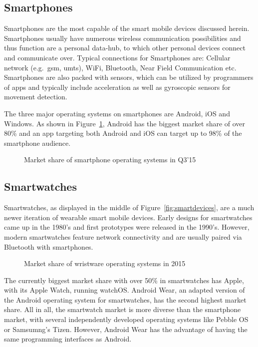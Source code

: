 \subsection{Smartphones}
Smartphones are the most capable of the smart mobile devices discussed herein. Smartphones usually have numerous wireless communication possibilities and thus function are a personal data-hub, to which other personal devices connect and communicate over. Typical connections for Smartphones are: Cellular network (e.g.\ \acrshort{gsm}, \acrshort{umts}), WiFi, Bluetooth, Near Field Communication etc. Smartphones are also packed with sensors, which can be utilized by programmers of \Glspl{app} and typically include acceleration as well as gyroscopic sensors for movement detection.

The three major operating systems on smartphones are Android, iOS and Windows. As shown in Figure~\ref{fig:smartphoneosmarketshare}, Android has the biggest market share of over 80\% and an \gls{app} targeting both Android and iOS can target up to 98\% of the smartphone audience.

\begin{figure}
    \centering
    
    \caption{Market share of smartphone operating systems in Q3'15\cite{gartner2015smartosmarketshare}}
    \label{fig:smartphoneosmarketshare}
\end{figure}

\subsection{Smartwatches}
Smartwatches, as displayed in the middle of Figure~\ref{fig:smartdevices}, are a much newer iteration of wearable smart mobile devices. Early designs for smartwatches came up in the 1980's and first prototypes were released in the 1990's. However, modern smartwatches feature network connectivity and are usually paired via Bluetooth with smartphones.

\begin{figure}
    \centering
    
    \caption{Market share of wristware operating systems in 2015\cite{idc2015wristmarketshare}}
    \label{fig:my_label}
\end{figure}

The currently biggest market share with over 50\% in smartwatches has Apple, with its Apple Watch, running watchOS. Android Wear, an adapted version of the Android operating system for smartwatches, has the second highest market share. All in all, the smartwatch market is more diverse than the smartphone market, with several independently developed operating systems like Pebble OS or Samsumng's Tizen. However, Android Wear has the advantage of having the same programming interfaces as Android. 

